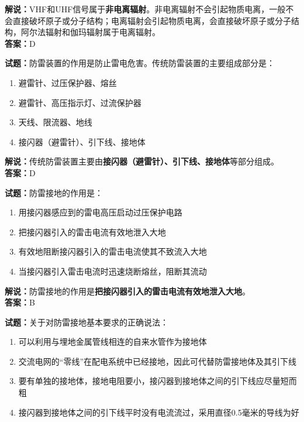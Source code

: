 \documentclass{ctexbook}
\begin{document}
\noindent\textbf{解说：}VHF和UHF信号属于\textbf{非电离辐射}。非电离辐射不会引起物质电离，一般不会直接破坏原子或分子结构；电离辐射会引起物质电离，会直接破坏原子或分子结构，阿尔法辐射和伽玛辐射属于电离辐射。\\\noindent\textbf{答案：}D

\vspace{\baselineskip}

\noindent\textbf{试题：}防雷装置的作用是防止雷电危害。传统防雷装置的主要组成部分是：

\begin{enumerate}[leftmargin=3em]
  \item 避雷针、过压保护器、熔丝
  \item 避雷针、高压指示灯、过流保护器
  \item 天线、限流器、地线
  \item 接闪器（避雷针）、引下线、接地体
\end{enumerate}

\noindent\textbf{解说：}传统防雷装置主要由\textbf{接闪器（避雷针）、引下线、接地体}等部分组成。\\\noindent\textbf{答案：}D

\vspace{\baselineskip}

\noindent\textbf{试题：}防雷接地的作用是：

\begin{enumerate}[leftmargin=3em]
  \item 用接闪器感应到的雷电高压启动过压保护电路
  \item 把接闪器引入的雷击电流有效地泄入大地
  \item 有效地阻断接闪器引入的雷击电流使其不致流入大地
  \item 当接闪器引入雷击电流时迅速烧断熔丝，阻断其流动
\end{enumerate}

\noindent\textbf{解说：}防雷接地的作用是\textbf{把接闪器引入的雷击电流有效地泄入大地}。\\\noindent\textbf{答案：}B

\vspace{\baselineskip}

\noindent\textbf{试题：}关于对防雷接地基本要求的正确说法：

\begin{enumerate}[leftmargin=3em]
  \item 可以利用与埋地金属管线相连的自来水管作为接地体
  \item 交流电网的“零线”在配电系统中已经接地，因此可代替防雷接地体及其引下线
  \item 要有单独的接地体，接地电阻要小，接闪器到接地体之间的引下线应尽量短而粗
  \item 接闪器到接地体之间的引下线平时没有电流流过，采用直径0.5毫米的导线为好
\end{enumerate}
\end{document}

